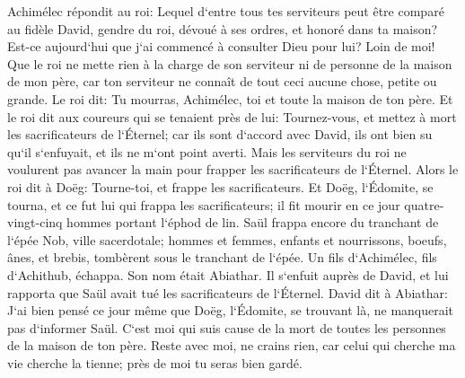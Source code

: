 \verse Achimélec répondit au roi: Lequel d`entre tous tes serviteurs peut être comparé au fidèle David, gendre du roi, dévoué à ses ordres, et honoré dans ta maison? 
\verse Est-ce aujourd`hui que j`ai commencé à consulter Dieu pour lui? Loin de moi! Que le roi ne mette rien à la charge de son serviteur ni de personne de la maison de mon père, car ton serviteur ne connaît de tout ceci aucune chose, petite ou grande. 
\verse Le roi dit: Tu mourras, Achimélec, toi et toute la maison de ton père. 
\verse Et le roi dit aux coureurs qui se tenaient près de lui: Tournez-vous, et mettez à mort les sacrificateurs de l`Éternel; car ils sont d`accord avec David, ils ont bien su qu`il s`enfuyait, et ils ne m`ont point averti. Mais les serviteurs du roi ne voulurent pas avancer la main pour frapper les sacrificateurs de l`Éternel. 
\verse Alors le roi dit à Doëg: Tourne-toi, et frappe les sacrificateurs. Et Doëg, l`Édomite, se tourna, et ce fut lui qui frappa les sacrificateurs; il fit mourir en ce jour quatre-vingt-cinq hommes portant l`éphod de lin. 
\verse Saül frappa encore du tranchant de l`épée Nob, ville sacerdotale; hommes et femmes, enfants et nourrissons, boeufs, ânes, et brebis, tombèrent sous le tranchant de l`épée. 
\verse Un fils d`Achimélec, fils d`Achithub, échappa. Son nom était Abiathar. Il s`enfuit auprès de David, 
\verse et lui rapporta que Saül avait tué les sacrificateurs de l`Éternel. 
\verse David dit à Abiathar: J`ai bien pensé ce jour même que Doëg, l`Édomite, se trouvant là, ne manquerait pas d`informer Saül. C`est moi qui suis cause de la mort de toutes les personnes de la maison de ton père. 
\verse Reste avec moi, ne crains rien, car celui qui cherche ma vie cherche la tienne; près de moi tu seras bien gardé. 

\chapter{}

